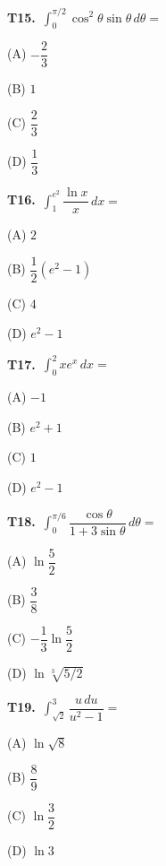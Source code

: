 \documentclass[11pt]{article}
\begin{document}
\bigskip\noindent\textbf{T15.}\ $\displaystyle\int_{0}^{\pi/2} \cos^2\theta\sin\theta\,d\theta =$
\begin{list}{}{\setlength{\leftmargin}{3em}\setlength{\labelwidth}{2.5em}\setlength{\itemsep}{0pt}\setlength{\topsep}{2pt}}
\item[(A)] $-\dfrac{2}{3}$
\item[(B)] $1$
\item[(C)] $\dfrac{2}{3}$
\item[(D)] $\dfrac{1}{3}$
\end{list}

\bigskip\noindent\textbf{T16.}\ $\displaystyle\int_{1}^{e^2} \dfrac{\ln x}{x}\,dx =$
\begin{list}{}{\setlength{\leftmargin}{3em}\setlength{\labelwidth}{2.5em}\setlength{\itemsep}{0pt}\setlength{\topsep}{2pt}}
\item[(A)] $2$
\item[(B)] $\dfrac{1}{2}(e^2-1)$
\item[(C)] $4$
\item[(D)] $e^2-1$
\end{list}

\bigskip\noindent\textbf{T17.}\ $\displaystyle\int_{0}^{2} xe^x\,dx =$
\begin{list}{}{\setlength{\leftmargin}{3em}\setlength{\labelwidth}{2.5em}\setlength{\itemsep}{0pt}\setlength{\topsep}{2pt}}
\item[(A)] $-1$
\item[(B)] $e^2+1$
\item[(C)] $1$
\item[(D)] $e^2-1$
\end{list}

\bigskip\noindent\textbf{T18.}\ $\displaystyle\int_{0}^{\pi/6} \dfrac{\cos\theta}{1+3\sin\theta}\,d\theta =$
\begin{list}{}{\setlength{\leftmargin}{3em}\setlength{\labelwidth}{2.5em}\setlength{\itemsep}{0pt}\setlength{\topsep}{2pt}}
\item[(A)] $\ln\dfrac{5}{2}$
\item[(B)] $\dfrac{3}{8}$
\item[(C)] $-\dfrac{1}{3}\ln\dfrac{5}{2}$
\item[(D)] $\ln\sqrt[3]{5/2}$
\end{list}

\bigskip\noindent\textbf{T19.}\ $\displaystyle\int_{\sqrt{2}}^{3} \dfrac{u\,du}{u^2-1} =$
\begin{list}{}{\setlength{\leftmargin}{3em}\setlength{\labelwidth}{2.5em}\setlength{\itemsep}{0pt}\setlength{\topsep}{2pt}}
\item[(A)] $\ln\sqrt{8}$
\item[(B)] $\dfrac{8}{9}$
\item[(C)] $\ln\dfrac{3}{2}$
\item[(D)] $\ln 3$
\end{list}
\end{document}
